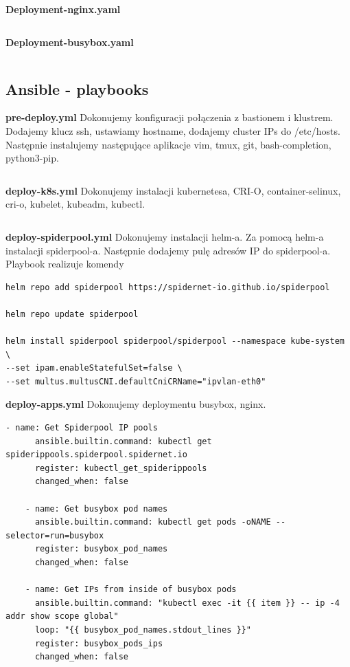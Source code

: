\documentclass[onecolumn,12pt]{article}
\begin{document}
\textbf{Deployment-nginx.yaml}
\begin{lstlisting}[style=yaml]
\end{lstlisting}


\textbf{Deployment-busybox.yaml}
\begin{lstlisting}[style=yaml]
\end{lstlisting}


\subsection{Ansible - playbooks}
\textbf{pre-deploy.yml} \newline
Dokonujemy konfiguracji połączenia z bastionem i klustrem. Dodajemy klucz ssh, ustawiamy hostname, dodajemy cluster IPs do /etc/hosts. Następnie instalujemy następujące aplikacje vim, tmux, git, bash-completion, python3-pip.
\begin{lstlisting}[style=yaml]
\end{lstlisting}


\textbf{deploy-k8s.yml} \newline
Dokonujemy instalacji kubernetesa, CRI-O, container-selinux, cri-o, kubelet, kubeadm, kubectl.
\begin{lstlisting}[style=yaml]
\end{lstlisting}

\textbf{deploy-spiderpool.yml} \newline
Dokonujemy instalacji helm-a. Za pomocą helm-a instalacji spiderpool-a. Następnie dodajemy pulę adresów IP do spiderpool-a. Playbook realizuje komendy
\begin{lstlisting}
helm repo add spiderpool https://spidernet-io.github.io/spiderpool

helm repo update spiderpool

helm install spiderpool spiderpool/spiderpool --namespace kube-system \
--set ipam.enableStatefulSet=false \
--set multus.multusCNI.defaultCniCRName="ipvlan-eth0"

\end{lstlisting}



\textbf{deploy-apps.yml} \newline
Dokonujemy deploymentu busybox, nginx.
\begin{lstlisting}[style=yaml]
    - name: Get Spiderpool IP pools
      ansible.builtin.command: kubectl get spiderippools.spiderpool.spidernet.io
      register: kubectl_get_spiderippools
      changed_when: false

    - name: Get busybox pod names
      ansible.builtin.command: kubectl get pods -oNAME --selector=run=busybox
      register: busybox_pod_names
      changed_when: false

    - name: Get IPs from inside of busybox pods
      ansible.builtin.command: "kubectl exec -it {{ item }} -- ip -4 addr show scope global"
      loop: "{{ busybox_pod_names.stdout_lines }}"
      register: busybox_pods_ips
      changed_when: false
\end{lstlisting}
\end{document}
